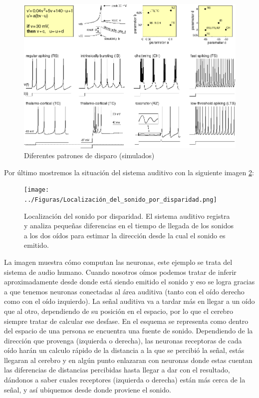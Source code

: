 \begin{figure}[h]
 \centering
 \includegraphics[scale=0.5]{../Figuras/Simple_Model_of_Spiking_Neurons.png}
 \caption{Diferentes patrones de disparo (simulados)}
 \label{fig:simpleModel}
\end{figure}

Por último mostremos la situación del sistema auditivo con la siguiente imagen \ref{fig:sonidoDisp}:

\begin{figure}[H]
 \centering
 \texttt{[image: ../Figuras/Localización\_del\_sonido\_por\_disparidad.png]}
 \caption{Localización del sonido por disparidad. El sistema auditivo registra y analiza pequeñas diferencias en el tiempo de llegada de
los sonidos a los dos oídos para estimar la dirección desde la cual el sonido es emitido.}
 \label{fig:sonidoDisp}
\end{figure}

La imagen muestra cómo computan las neuronas, este ejemplo se trata del sistema de audio humano. Cuando nosotros oímos podemos tratar de inferir aproximadamente desde donde está siendo emitido el sonido y eso se logra gracias a que tenemos neuronas conectadas al área auditiva (tanto con el oído derecho como con el oído izquierdo). La señal auditiva va a tardar más en llegar a un oído que al otro, dependiendo de su posición en el espacio, por lo que el cerebro siempre tratar de calcular ese desfase.  
En el esquema se representa como dentro del espacio de una persona se encuentra una fuente de sonido. Dependiendo de la dirección que provenga (izquierda o derecha), las neuronas receptoras de cada oído harán un calculo rápido de la distancia a la que se percibió la señal, estás llegaran al cerebro y en algún punto enlazaran con neuronas donde estas cuentan las diferencias de distancias percibidas hasta llegar a dar con el resultado, dándonos a saber cuales receptores (izquierda o derecha) están más cerca de la señal, y así ubiquemos desde donde proviene el sonido.


